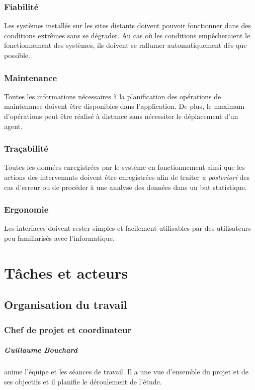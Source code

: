 \documentclass[a4paper, 11pt, draft]{report}
\begin{document}
    \subsection{Fiabilité} %
        Les systèmes installés sur les sites distants doivent pouvoir fonctionner dans des conditions extrêmes sans se dégrader. Au cas où les conditions empêcheraient le fonctionnement des systèmes, ils doivent se rallumer automatiquement dès que possible.

    \subsection{Maintenance} %
        Toutes les informations nécessaires à la planification des opérations de maintenance doivent être disponibles dans l'application. De plus, le maximum d'opérations peut être réalisé à distance sans nécessiter le déplacement d'un agent.

    \subsection{Traçabilité} %
        Toutes les données enregistrées par le système en fonctionnement ainsi que les actions des intervenants doivent être enregistrées afin de traiter \emph{a posteriori} des cas d'erreur ou de procéder à une analyse des données dans un but statistique.

    \subsection{Ergonomie} %
        Les interfaces doivent rester simples et facilement utilisables par des utilisateurs peu familiarisés avec l'informatique.

\chapter{Tâches et acteurs}

\section{Organisation du travail}
    \subsection{Chef de projet et coordinateur}
        \paragraph{Guillaume Bouchard} anime l'équipe et les séances de travail. Il a une vue d'ensemble du projet et de ses objectifs et il planifie le déroulement de l'étude.
\end{document}
